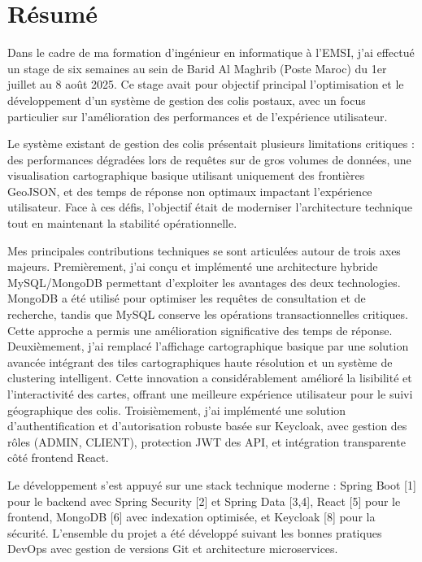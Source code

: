 \chapter*{Résumé}

Dans le cadre de ma formation d'ingénieur en informatique à l'EMSI, j'ai effectué un stage de six semaines au sein de Barid Al Maghrib (Poste Maroc) du 1er juillet au 8 août 2025. Ce stage avait pour objectif principal l'optimisation et le développement d'un système de gestion des colis postaux, avec un focus particulier sur l'amélioration des performances et de l'expérience utilisateur.

Le système existant de gestion des colis présentait plusieurs limitations critiques : des performances dégradées lors de requêtes sur de gros volumes de données, une visualisation cartographique basique utilisant uniquement des frontières GeoJSON, et des temps de réponse non optimaux impactant l'expérience utilisateur. Face à ces défis, l'objectif était de moderniser l'architecture technique tout en maintenant la stabilité opérationnelle.

Mes principales contributions techniques se sont articulées autour de trois axes majeurs. Premièrement, j'ai conçu et implémenté une architecture hybride MySQL/MongoDB permettant d'exploiter les avantages des deux technologies. MongoDB a été utilisé pour optimiser les requêtes de consultation et de recherche, tandis que MySQL conserve les opérations transactionnelles critiques. Cette approche a permis une amélioration significative des temps de réponse. Deuxièmement, j'ai remplacé l'affichage cartographique basique par une solution avancée intégrant des tiles cartographiques haute résolution et un système de clustering intelligent. Cette innovation a considérablement amélioré la lisibilité et l'interactivité des cartes, offrant une meilleure expérience utilisateur pour le suivi géographique des colis. Troisièmement, j'ai implémenté une solution d'authentification et d'autorisation robuste basée sur Keycloak, avec gestion des rôles (ADMIN, CLIENT), protection JWT des API, et intégration transparente côté frontend React.

Le développement s'est appuyé sur une stack technique moderne : Spring Boot [1] pour le backend avec Spring Security [2] et Spring Data [3,4], React [5] pour le frontend, MongoDB [6] avec indexation optimisée, et Keycloak [8] pour la sécurité. L'ensemble du projet a été développé suivant les bonnes pratiques DevOps avec gestion de versions Git et architecture microservices.

